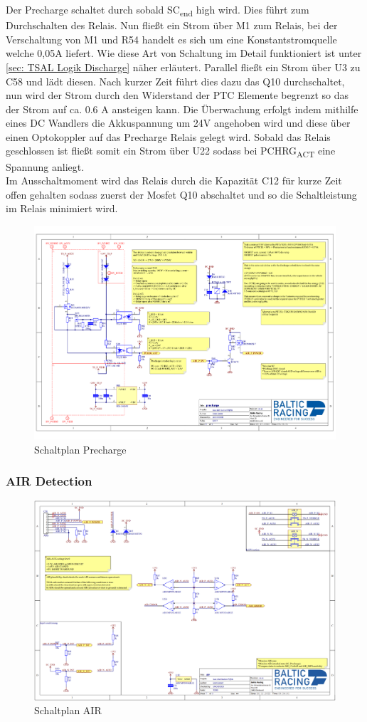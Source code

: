 Der Precharge schaltet durch sobald SC\textsubscript{end} high wird. Dies führt zum Durchschalten des Relais. Nun fließt ein Strom über M1 zum Relais, bei der Verschaltung von M1 und R54 handelt es sich um eine Konstantstromquelle welche 0,05A liefert. Wie diese Art von Schaltung im Detail funktioniert ist unter \ref{sec: TSAL Logik Discharge} näher erläutert. Parallel fließt ein Strom über U3 zu C58 und lädt diesen. Nach kurzer Zeit führt dies dazu das Q10 durchschaltet, nun wird der Strom durch den Widerstand der PTC Elemente begrenzt so das der Strom auf ca. 0.6 A ansteigen kann. Die Überwachung erfolgt indem mithilfe eines DC Wandlers die Akkuspannung um 24V angehoben wird und diese über einen Optokoppler auf das Precharge Relais gelegt wird. Sobald das Relais geschlossen ist fließt somit ein Strom über U22 sodass bei PCHRG\textsubscript{ACT} eine Spannung anliegt.
\\
Im Ausschaltmoment wird das Relais durch die Kapazität C12 für kurze Zeit offen gehalten sodass zuerst der Mosfet Q10 abschaltet und so die Schaltleistung im Relais minimiert wird.

\begin{figure}
	\centering
	\includegraphics[width=0.7\linewidth]{bilder/Precharge_Complete}
	\caption{Schaltplan Precharge}
	\label{fig:prechargecomplete}
\end{figure}
\FloatBarrier

\subsubsection{\ac{AIR} Detection}

\begin{figure}
	\centering
	\includegraphics[width=0.7\linewidth]{bilder/AIR_conditioning}
	\caption{Schaltplan AIR}
	\label{fig:airconditioning}
\end{figure}

